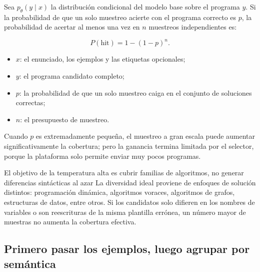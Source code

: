 
Sea $p_\theta(y\mid x)$ la distribución condicional del modelo base sobre el programa $y$. Si la probabilidad de que un solo muestreo acierte con el programa correcto es $p$, la probabilidad de acertar al menos una vez en $n$ muestreos independientes es:

$$
P(\text{hit})=1-(1-p)^n.
$$

\begin{itemize}
    \item $x$: el enunciado, los ejemplos y las etiquetas opcionales;
    \item $y$: el programa candidato completo;
    \item $p$: la probabilidad de que un solo muestreo caiga en el conjunto de soluciones correctas;
    \item $n$: el presupuesto de muestreo.
\end{itemize}

Cuando $p$ es extremadamente pequeña, el muestreo a gran escala puede aumentar significativamente la cobertura; pero la ganancia termina limitada por el selector, porque la plataforma solo permite enviar muy pocos programas.

\begin{importantbox}{El objetivo de la temperatura alta es cubrir familias de algoritmos, no generar diferencias sintácticas al azar}
La diversidad ideal proviene de enfoques de solución distintos: programación dinámica, algoritmos voraces, algoritmos de grafos, estructuras de datos, entre otros. Si los candidatos solo difieren en los nombres de variables o son reescrituras de la misma plantilla errónea, un número mayor de muestras no aumenta la cobertura efectiva.
\end{importantbox}

\subsection{Primero pasar los ejemplos, luego agrupar por semántica}


